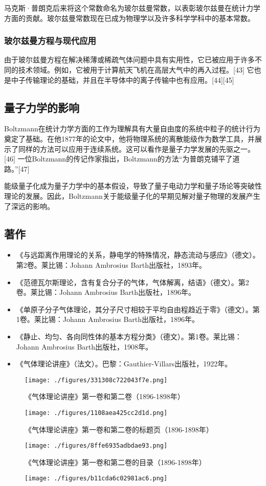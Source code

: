 马克斯·普朗克后来将这个常数命名为玻尔兹曼常数，以表彰玻尔兹曼在统计力学方面的贡献。玻尔兹曼常数现在已成为物理学以及许多科学学科中的基本常数。
\subsubsection{玻尔兹曼方程与现代应用}
由于玻尔兹曼方程在解决稀薄或稀疏气体问题中具有实用性，它已被应用于许多不同的技术领域。例如，它被用于计算航天飞机在高层大气中的再入过程。[43] 它也是中子传输理论的基础，并且在半导体中的离子传输中也有应用。[44][45]
\subsection{量子力学的影响}
Boltzmann在统计力学方面的工作为理解具有大量自由度的系统中粒子的统计行为奠定了基础。在他1877年的论文中，他将物理系统的离散能级作为数学工具，并展示了同样的方法可以应用于连续系统。这可以看作是量子力学发展的先驱之一。[46] 一位Boltzmann的传记作家指出，Boltzmann的方法“为普朗克铺平了道路。”[47]  

能级量子化成为量子力学中的基本假设，导致了量子电动力学和量子场论等突破性理论的发展。因此，Boltzmann关于能级量子化的早期见解对量子物理的发展产生了深远的影响。
\subsection{著作}
\begin{itemize}
\item 《与远距离作用理论的关系，静电学的特殊情况，静态流动与感应》（德文）。第2卷。莱比锡：Johann Ambrosius Barth出版社，1893年。
\item 《范德瓦尔斯理论，含有复合分子的气体，气体解离，结语》（德文）。第2卷。莱比锡：Johann Ambrosius Barth出版社，1896年。
\item 《单原子分子气体理论，其分子尺寸相较于平均自由程趋近于零》（德文）。第1卷。莱比锡：Johann Ambrosius Barth出版社，1896年。
\item 《静止、均匀、各向同性体的基本方程分类》（德文）。第1卷。莱比锡：Johann Ambrosius Barth出版社，1908年。
\item 《气体理论讲座》（法文）。巴黎：Gauthier-Villars出版社，1922年。
\end{itemize}
\begin{figure}[ht]
\centering
\texttt{[image: ./figures/331308c722043f7e.png]}
\caption{《气体理论讲座》第一卷和第二卷（1896-1898年）} \label{fig_BRZM_6}
\end{figure}
\begin{figure}[ht]
\centering
\texttt{[image: ./figures/1108aea425cc2d1d.png]}
\caption{《气体理论讲座》第一卷和第二卷的标题页（1896-1898年）} \label{fig_BRZM_7}
\end{figure}
\begin{figure}[ht]
\centering
\texttt{[image: ./figures/8ffe6935adbdae93.png]}
\caption{《气体理论讲座》第一卷和第二卷的目录（1896-1898年）} \label{fig_BRZM_8}
\end{figure}
\begin{figure}[ht]
\centering
\texttt{[image: ./figures/b11cda6c02981ac6.png]}
\caption{} \label{fig_BRZM_9}
\end{figure}